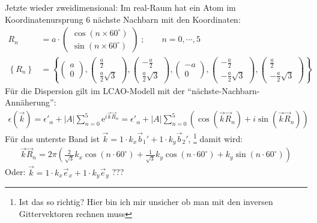 Jetzte wieder zweidimensional: Im real-Raum hat ein Atom im Koordinatenursprung
6 nächste Nachbarn mit den Koordinaten:
\begin{align*}
R_n &= a \cdot  \begin{pmatrix} \cos(n \times 60^\circ)\\ \sin(n \times 60^\circ) \end{pmatrix}\;; \qquad
  n = 0, \cdots , 5 \\
\left\lbrace R_n\right\rbrace &= \left\lbrace
  \begin{pmatrix}a\\0\end{pmatrix}, \begin{pmatrix}\frac{a}{2}\\\frac{a}{2}\sqrt{3}\end{pmatrix}, \begin{pmatrix}-\frac{a}{2}\\\frac{a}{2}\sqrt{3}\end{pmatrix},
  \begin{pmatrix}-a\\0\end{pmatrix}, \begin{pmatrix}-\frac{a}{2}\\-\frac{a}{2}\sqrt{3}\end{pmatrix}, \begin{pmatrix}\frac{a}{2}\\-\frac{a}{2}\sqrt{3}\end{pmatrix}
  \right\rbrace
\end{align*}
Für die Dispersion gilt im LCAO-Modell mit der "`nächste-Nachbarn-Annäherung"':
\begin{align*}
  \epsilon(\vec k) = \epsilon'_\alpha + |A| \sum_{n = 0}^5 \mathrm e^{i \vec k \vec R_n}
  =  \epsilon'_\alpha + |A| \sum_{n = 0}^5 (\cos (\vec k \vec R_n) + i \sin(\vec k \vec R_n))
\end{align*}
Für das unterste Band ist $\vec k = 1 \cdot k_x \vec b_1' + 1 \cdot k_y \vec b_2'$,
\footnote{Ist das so richtig? Hier bin ich mir unsicher ob man mit den
inversen Gittervektoren rechnen muss}
damit wird:
\begin{align*}
  \vec k \vec R_n  =  2 \pi \left(\frac{2}{\sqrt{3}} k_x\cos(n \cdot 60^\circ) + \frac{1}{\sqrt{3}} k_y\cos(n \cdot 60^\circ) + k_y \sin(n \cdot 60^\circ)\right)
\end{align*}
Oder: $\vec k = 1 \cdot k_x \vec e_x + 1 \cdot k_y \vec e_y$ ???
